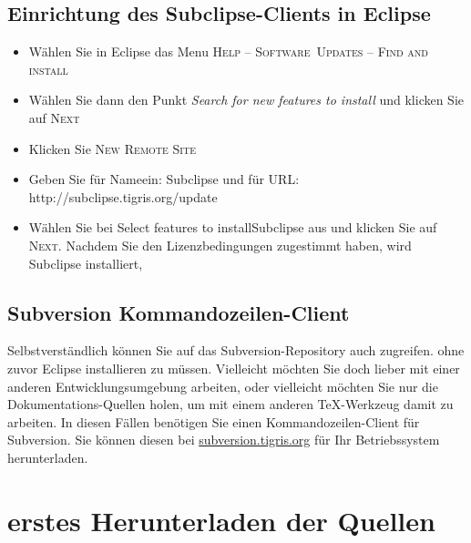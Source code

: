 \subsection{Einrichtung des Subclipse-Clients in Eclipse}
\label{subclipse}
\begin{itemize}
  \item Wählen Sie in Eclipse das Menu \textsc{Help -- Software~Updates -- Find
  and install}
  \item Wählen Sie dann den Punkt \textit{Search for new features to install} und
  klicken Sie auf \textsc{Next}
  \item Klicken Sie \textsc{New Remote Site}
  \item Geben Sie für \glq Name\grq ein: Sub\-clipse und für \glq URL\grq:
  http://sub\-clipse.tigris.org/update
  \item Wählen Sie bei \glqq Select features to install\grqq Subclipse aus und
  klicken Sie auf \textsc{Next}. Nachdem Sie den Lizenzbedingungen zugestimmt
  haben, wird Subclipse installiert,

\end{itemize}
\subsection{Subversion Kommandozeilen-Client}
\label{subversionclient}
Selbstverständlich können Sie auf das Subversion-Repository auch zugreifen. ohne
zuvor Eclipse installieren zu müssen. Vielleicht möchten Sie doch lieber mit
einer anderen Entwicklungsumgebung arbeiten, oder vielleicht möchten Sie nur die
Dokumentations-Quellen holen, um mit einem anderen \TeX-Werkzeug damit zu
arbeiten. In diesen Fällen benötigen Sie einen Kommandozeilen-Client für
Subversion. Sie können diesen bei
\href{http://subversion.tigris.org}{subversion.tigris.org} für Ihr
Betriebssystem herunterladen.

\section{erstes Herunterladen der Quellen}
